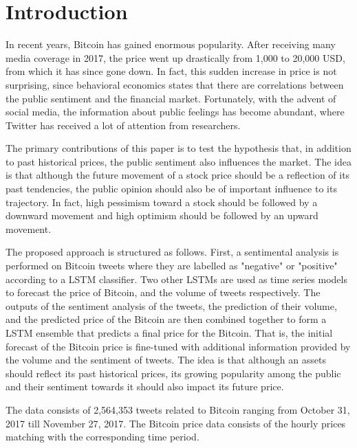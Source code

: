 \documentclass[conference]{IEEEtran}
\begin{document}
\section{Introduction}
\par In recent years, Bitcoin has gained enormous popularity. After receiving many media coverage in 2017, the price went up drastically from 1,000 to 20,000 USD, from which it has since gone down. In fact, this sudden increase in price is not surprising, since behavioral economics states that there are correlations between the public sentiment and the financial market. Fortunately, with the advent of social media, the information about public feelings has become abundant, where Twitter has received a lot of attention from researchers.
\par The primary contributions of this paper is to test the hypothesis that, in addition to past historical prices, the public sentiment also influences the market. The idea is that although the future movement of a stock price should be a reflection of its past tendencies, the public opinion should also be of important influence to its trajectory. In fact, high pessimism toward a stock should be followed by a downward movement and high optimism should be followed by an upward movement. 
\par The proposed approach is structured as follows. First, a sentimental analysis is performed on Bitcoin tweets where they are labelled as "negative" or "positive" according to a LSTM classifier. Two other LSTMs are used as time series models to forecast the price of Bitcoin, and the volume of tweets respectively. The outputs of the sentiment analysis of the tweets, the prediction of their volume, and the predicted price of the Bitcoin are then combined together to form a LSTM ensemble that predicts a final price for the Bitcoin. That is, the initial forecast of the Bitcoin price is fine-tuned with additional information provided by the volume and the sentiment of tweets. The idea is that although an assets should reflect its past historical prices, its growing popularity among the public and their sentiment towards it should also impact its future price.
\par The data consists of 2,564,353 tweets related to Bitcoin ranging from October 31, 2017 till November 27, 2017. The Bitcoin price data consists of the hourly prices matching with the corresponding time period.
	 
\end{document}
